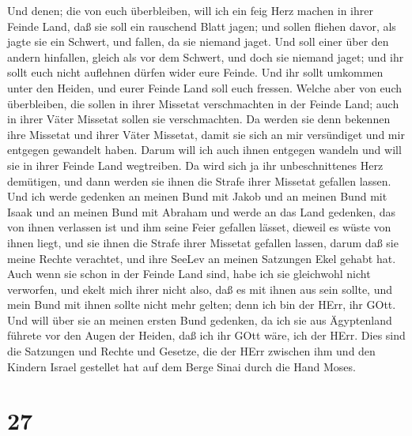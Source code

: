 Und denen; die von euch überbleiben, will ich ein feig Herz machen in
ihrer Feinde Land, daß sie soll ein rauschend Blatt jagen; und sollen
fliehen davor, als jagte sie ein Schwert, und fallen, da sie niemand
jaget.  Und soll einer über den andern hinfallen, gleich
als vor dem Schwert, und doch sie niemand jaget; und ihr sollt euch
nicht auflehnen dürfen wider eure Feinde.  Und ihr sollt
umkommen unter den Heiden, und eurer Feinde Land soll euch fressen.
 Welche aber von euch überbleiben, die sollen in ihrer
Missetat verschmachten in der Feinde Land; auch in ihrer Väter Missetat
sollen sie verschmachten.  Da werden sie denn bekennen ihre
Missetat und ihrer Väter Missetat, damit sie sich an mir versündiget und
mir entgegen gewandelt haben.  Darum will ich auch ihnen
entgegen wandeln und will sie in ihrer Feinde Land wegtreiben. Da wird
sich ja ihr unbeschnittenes Herz demütigen, und dann werden sie ihnen
die Strafe ihrer Missetat gefallen lassen.  Und ich werde
gedenken an meinen Bund mit Jakob und an meinen Bund mit Isaak und an
meinen Bund mit Abraham und werde an das Land gedenken, 
das von ihnen verlassen ist und ihm seine Feier gefallen lässet, dieweil
es wüste von ihnen liegt, und sie ihnen die Strafe ihrer Missetat
gefallen lassen, darum daß sie meine Rechte verachtet, und ihre SeeLev
an meinen Satzungen Ekel gehabt hat.  Auch wenn sie schon
in der Feinde Land sind, habe ich sie gleichwohl nicht verworfen, und
ekelt mich ihrer nicht also, daß es mit ihnen aus sein sollte, und mein
Bund mit ihnen sollte nicht mehr gelten; denn ich bin der HErr, ihr
GOtt.  Und will über sie an meinen ersten Bund gedenken, da
ich sie aus Ägyptenland führete vor den Augen der Heiden, daß ich ihr
GOtt wäre, ich der HErr.  Dies sind die Satzungen und
Rechte und Gesetze, die der HErr zwischen ihm und den Kindern Israel
gestellet hat auf dem Berge Sinai durch die Hand Moses.

\hypertarget{section-26}{%
\section{27}\label{section-26}}

